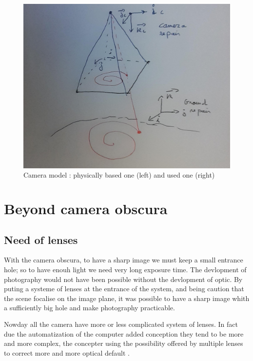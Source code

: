 \begin{figure}
\centering
	\includegraphics[width=12cm]{Methods/Images/RepairCam.jpg}
	\caption{Camera model : physically based one (left) and used one (right)}
	\label{fig:FormIm}
\end{figure}


\section{Beyond camera obscura}

\subsection{Need of lenses}

With the camera obscura, to have a sharp image we must keep a small entrance hole;
so to have enouh light we need very long exposure time. The devlopment of photography
would not have been possible without the devlopment of optic. By puting a systeme
of lenses at the entrance of the system, and being caution that the  scene focalise
on the image plane, it was possible to have a sharp image whith a sufficiently big
hole and make photography practicable.

Nowday all the camera have more or less complicated system of lenses. In fact due the
automatization of the computer added conception they tend to be more and more complex, the concepter
using the possibility offered by multiple lenses to correct more and more optical default .

